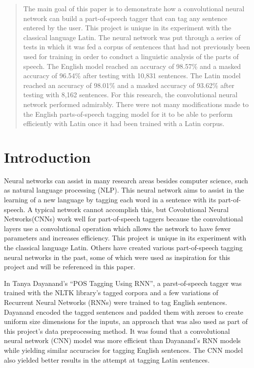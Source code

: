 \documentclass[conference]{IEEEtran}
\begin{document}
\begin{abstract}

The main goal of this paper is to demonstrate how a convolutional neural network can build a part-of-speech tagger that can tag any sentence entered by the user. This project is unique in its experiment with the classical language Latin. The neural network was put through a series of tests in which it was fed a corpus of sentences that had not previously been used for training in order to conduct a linguistic analysis of the parts of speech. The English model reached an accuracy of 98.57\% and a masked accuracy of 96.54\% after testing with 10,831 sentences. The Latin model reached an accuracy of 98.01\% and a masked accuracy of 93.62\% after testing with 8,162 sentences. For this research, the convolutional neural network performed admirably. There were not many modifications made to the English parts-of-speech tagging model for it to be able to perform efficiently with Latin once it had been trained with a Latin corpus.

\end{abstract}

\section{Introduction}
    Neural networks can assist in many research areas besides computer science, such as natural language processing (NLP). This neural network aims to assist in the learning of a new language by tagging each word in a sentence with its part-of-speech. A typical network cannot accomplish this, but Covolutional Neural Networks(CNNs) work well for part-of-speech taggers because the convolutional layers use a convolutional operation which allows the network to have fewer parameters and increases efficiency\cite{b3}. This project is unique in its experiment with the classical language Latin. Others have created various part-of-speech tagging neural networks in the past, some of which were used as inspiration for this project and will be referenced in this paper.
    
    In Tanya Dayanand’s “POS Tagging Using RNN”, a parst-of-speech tagger was trained with the NLTK library’s tagged corpora and a few variations of Recurrent Neural Networks (RNNs) were trained to tag English sentences\cite{b1}. Dayanand encoded the tagged sentences and padded them with zeroes to create uniform size dimensions for the inputs, an approach that was also used as part of this project’s data preprocessing method. It was found that a convolutional neural network (CNN) model was more efficient than Dayanand’s RNN models while yielding similar accuracies for tagging English sentences. The CNN model also yielded better results in the attempt at tagging Latin sentences.
    
\end{document}
